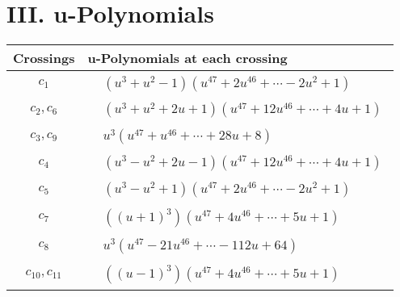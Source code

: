 \documentclass[1p]{elsarticle_modified}
\theoremstyle{definition}
\begin{document}
\newpage\renewcommand{\arraystretch}{1}
\centering \section*{ III. u-Polynomials}
\begin{tabular}{m{50pt}|m{274pt}}
Crossings & \hspace{64pt}u-Polynomials at each crossing \\
\hline $$\begin{aligned}c_{1}\end{aligned}$$&$\begin{aligned}
&(u^3+u^2-1)(u^{47}+2 u^{46}+\cdots-2 u^2+1)
\end{aligned}$\\
\hline $$\begin{aligned}c_{2},c_{6}\end{aligned}$$&$\begin{aligned}
&(u^3+u^2+2 u+1)(u^{47}+12 u^{46}+\cdots+4 u+1)
\end{aligned}$\\
\hline $$\begin{aligned}c_{3},c_{9}\end{aligned}$$&$\begin{aligned}
&u^3(u^{47}+u^{46}+\cdots+28 u+8)
\end{aligned}$\\
\hline $$\begin{aligned}c_{4}\end{aligned}$$&$\begin{aligned}
&(u^3- u^2+2 u-1)(u^{47}+12 u^{46}+\cdots+4 u+1)
\end{aligned}$\\
\hline $$\begin{aligned}c_{5}\end{aligned}$$&$\begin{aligned}
&(u^3- u^2+1)(u^{47}+2 u^{46}+\cdots-2 u^2+1)
\end{aligned}$\\
\hline $$\begin{aligned}c_{7}\end{aligned}$$&$\begin{aligned}
&((u+1)^3)(u^{47}+4 u^{46}+\cdots+5 u+1)
\end{aligned}$\\
\hline $$\begin{aligned}c_{8}\end{aligned}$$&$\begin{aligned}
&u^3(u^{47}-21 u^{46}+\cdots-112 u+64)
\end{aligned}$\\
\hline $$\begin{aligned}c_{10},c_{11}\end{aligned}$$&$\begin{aligned}
&((u-1)^3)(u^{47}+4 u^{46}+\cdots+5 u+1)
\end{aligned}$\\
\hline
\end{tabular}\newpage\renewcommand{\arraystretch}{1}
\end{document}
